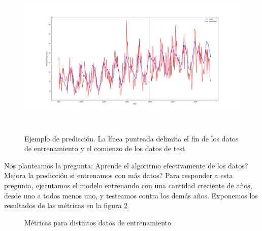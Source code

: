 \begin{figure}[hbtp]
  \centering
  \includegraphics[width=\textwidth, height=3in]{plots/example_fit_and_prediction.png}
  \caption{Ejemplo de predicci\'on. La l\'inea punteada delimita el fin de los datos de
  entrenamiento y el comienzo de los datos de test}
  \label{fig:example_fit_prediction}
\end{figure}

Nos planteamos la pregunta: \textquestiondown Aprende el algoritmo efectivamente de los datos? \textquestiondown Mejora la predicci\'on si
entrenamos con m\'as datos? Para responder a esta pregunta, ejecutamos el modelo entrenando con una cantidad
creciente de a\~nos, desde uno a todos menos uno, y testeamos contra los dem\'as a\~nos. Exponemos
los resultados de las m\'etricas en la figura \ref{table:metrics}

\begin{figure}
\begin{center}
\end{center}
\caption{M\'etricas para distintos datos de entrenamiento}
\label{table:metrics}
\end{figure}

